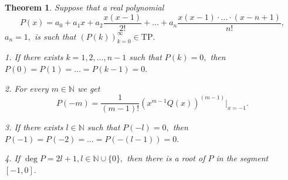 \documentclass[12pt]{amsart}
\newcounter{count}
\numberwithin{count}{section}
\newtheorem{Theorem}[count]{Theorem}
\begin{document}
\begin{Theorem}
\label{th1}
Suppose that a real polynomial 
$$P(x)= a_0 + a_1 x +a_2 \frac{x(x-1)}{2!} 
+  \ldots +a_n \frac{x(x-1)\cdot \ldots \cdot (x-n+1)}{n!},$$
$a_n=1, $   is such that $(P(k))_{k=0}^\infty \in \mathrm{TP}.$ 

1. If there exists $k=1, 2, \ldots, n-1$ such that $P(k)=0,$ then
$P(0) = P(1) = \ldots = P(k-1)=0.$

2.  For every $m\in \mathbb{N}$ we get
\begin{equation}
\label{f110}
P(- m) = \frac{1}{(m-1)!}  \left(x^{m-1} Q(x)\right)^{(m-1)}|_{x=-1}.
\end{equation}

3.  If there exists $l \in \mathbb{N}$ such that $P(-l)=0,$ then
$P(-1) = P(-2) = \ldots = P(-(l-1))=0.$

4. If $\deg P = 2l+1, l \in \mathbb{N}\cup \{0\},$  then there is a root of
$P$ in the segment $[-1, 0].$

\end{Theorem}
\end{document}
